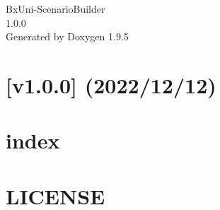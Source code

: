 \documentclass[twoside]{book}
\newcommand{\+}{\discretionary{\mbox{\scriptsize$\hookleftarrow$}}{}{}}
\newcommand{\clearemptydoublepage}{%
    \newpage{\pagestyle{empty}\cleardoublepage}%
  }
\begin{document}
  \raggedbottom
  \begin{CJK}{UTF8}{min}
    \hypersetup{pageanchor=false,
                bookmarksnumbered=true,
                pdfencoding=unicode
               }
  \begin{titlepage}
  \vspace*{7cm}
  \begin{center}%
  {\Large Bx\+Uni-\/\+Scenario\+Builder}\\
  [1ex]\large 1.\+0.\+0 \\
  \vspace*{1cm}
  {\large Generated by Doxygen 1.9.5}\\
  \end{center}
  \end{titlepage}
  \clearemptydoublepage
  \tableofcontents
  \clearemptydoublepage
  \hypersetup{pageanchor=true}
\chapter{\mbox{[}v1.0.0\mbox{]} (2022/12/12)}
\label{md__c__home_murakami__b_x_tools__bx_uni__scenario_builder__packages__bx_uni__scenario_builder__c_h_a_n_g_e_l_o_g}

\chapter{index}
\label{md__c__home_murakami__b_x_tools__bx_uni__scenario_builder__packages__bx_uni__scenario_builder__documents__index}

\chapter{LICENSE}
\label{md__c__home_murakami__b_x_tools__bx_uni__scenario_builder__packages__bx_uni__scenario_builder__l_i_c_e_n_s_e}


\end{CJK}
\end{document}
